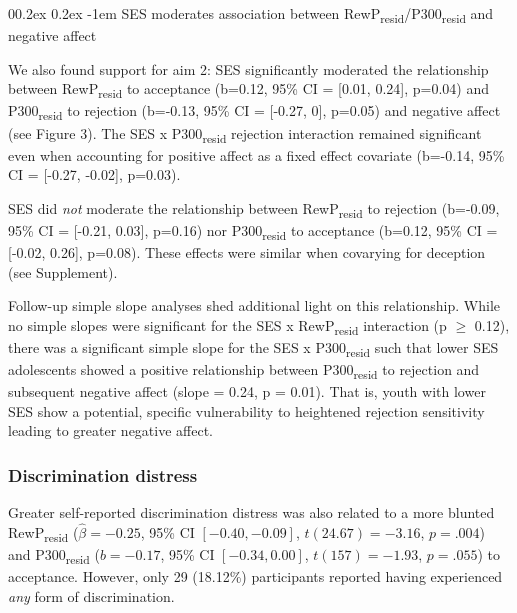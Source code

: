 \documentclass[
  man]{apa7}
\makeatletter
\let\oldparagraph\paragraph
\renewcommand{\paragraph}[1]{\oldparagraph{#1}\mbox{}}
\renewcommand{\paragraph}{\@startsection{paragraph}{4}{\parindent}%
  {0\baselineskip \@plus 0.2ex \@minus 0.2ex}%
  {-1em}%
  {\normalfont\normalsize\bfseries\itshape\typesectitle}}
\makeatother
\begin{document}
\hypertarget{ses-moderates-association-between-rewpresidp300resid-and-negative-affect}{%
\paragraph{\texorpdfstring{SES moderates association between RewP\textsubscript{resid}/P300\textsubscript{resid} and negative affect}{SES moderates association between RewPresid/P300resid and negative affect}}\label{ses-moderates-association-between-rewpresidp300resid-and-negative-affect}}

We also found support for aim 2: SES significantly moderated the relationship between RewP\textsubscript{resid} to acceptance (b=0.12, 95\% CI = {[}0.01, 0.24{]}, p=0.04) and P300\textsubscript{resid} to rejection (b=-0.13, 95\% CI = {[}-0.27, 0{]}, p=0.05) and negative affect (see Figure 3). The SES x P300\textsubscript{resid} rejection interaction remained significant even when accounting for positive affect as a fixed effect covariate (b=-0.14, 95\% CI = {[}-0.27, -0.02{]}, p=0.03).

SES did \emph{not} moderate the relationship between RewP\textsubscript{resid} to rejection (b=-0.09, 95\% CI = {[}-0.21, 0.03{]}, p=0.16) nor P300\textsubscript{resid} to acceptance (b=0.12, 95\% CI = {[}-0.02, 0.26{]}, p=0.08). These effects were similar when covarying for deception (see Supplement).

Follow-up simple slope analyses shed additional light on this relationship. While no simple slopes were significant for the SES x RewP\textsubscript{resid} interaction (p \(\ge\) 0.12), there was a significant simple slope for the SES x P300\textsubscript{resid} such that lower SES adolescents showed a positive relationship between P300\textsubscript{resid} to rejection and subsequent negative affect (slope = 0.24, p = 0.01). That is, youth with lower SES show a potential, specific vulnerability to heightened rejection sensitivity leading to greater negative affect.

\hypertarget{discrimination-distress}{%
\subsubsection{Discrimination distress}\label{discrimination-distress}}

Greater self-reported discrimination distress was also related to a more blunted RewP\textsubscript{resid} (\(\hat{\beta} = -0.25\), 95\% CI \([-0.40, -0.09]\), \(t(24.67) = -3.16\), \(p = .004\)) and P300\textsubscript{resid} (\(b = -0.17\), 95\% CI \([-0.34, 0.00]\), \(t(157) = -1.93\), \(p = .055\)) to acceptance. However, only 29 (18.12\%) participants reported having experienced \emph{any} form of discrimination.
\end{document}

